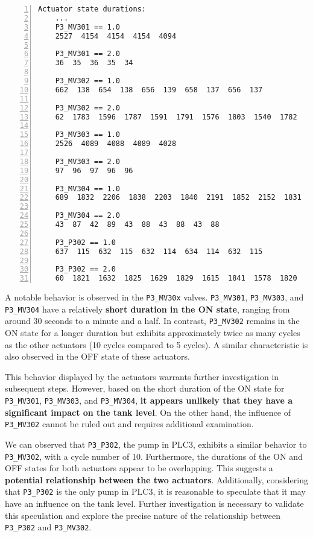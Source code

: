 \begin{lstlisting}[language=bash, numbers=left, caption=Time duration of the states of actuators of PLC3, label=lst:6_preproc_P2P3_actuator_duration]
	Actuator state durations:
	...
	P3_MV301 == 1.0
	2527  4154  4154  4154  4094
	
	P3_MV301 == 2.0
	36  35  36  35  34
	
	P3_MV302 == 1.0
	662  138  654  138  656  139  658  137  656  137
	
	P3_MV302 == 2.0
	62  1783  1596  1787  1591  1791  1576  1803  1540  1782
	
	P3_MV303 == 1.0
	2526  4089  4088  4089  4028
	
	P3_MV303 == 2.0
	97  96  97  96  96
		
	P3_MV304 == 1.0
	689  1832  2206  1838  2203  1840  2191  1852  2152  1831
	
	P3_MV304 == 2.0
	43  87  42  89  43  88  43  88  43  88
	
	P3_P302 == 1.0
	637  115  632  115  632  114  634  114  632  115
	
	P3_P302 == 2.0
	60  1821  1632  1825  1629  1829  1615  1841  1578  1820
\end{lstlisting}

A notable behavior is observed in the \texttt{P3\_MV30x} valves. \texttt{P3\_MV301}, \texttt{P3\_MV303}, and \texttt{P3\_MV304} have a relatively \textbf{short duration in the ON state}, ranging from around 30 seconds to a minute and a half. In contrast, \texttt{P3\_MV302} remains in the ON state for a longer duration but exhibits approximately twice as many cycles as the other actuators (10 cycles compared to 5 cycles). A similar characteristic is also observed in the OFF state of these actuators.

This behavior displayed by the actuators warrants further investigation in subsequent steps. However, based on the short duration of the ON state for \texttt{P3\_MV301}, \texttt{P3\_MV303}, and \texttt{P3\_MV304}, \textbf{it appears unlikely that they have a significant impact on the tank level}. On the other hand, the influence of \texttt{P3\_MV302} cannot be ruled out and requires additional examination.

\bigskip
We can observed that \texttt{P3\_P302}, the pump in PLC3, exhibits a similar behavior to \texttt{P3\_MV302}, with a cycle number of 10. Furthermore, the durations of the ON and OFF states for both actuators appear to be overlapping. This suggests a \textbf{potential relationship between the two actuators}. Additionally, considering that \texttt{P3\_P302} is the only pump in PLC3, it is reasonable to speculate that it may have an influence on the tank level. Further investigation is necessary to validate this speculation and explore the precise nature of the relationship between \texttt{P3\_P302} and \texttt{P3\_MV302}.

